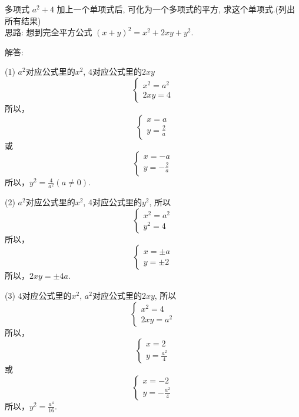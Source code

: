 \item {
    多项式 $a^2 + 4$ 加上一个单项式后, 可化为一个多项式的平方, 求这个单项式.(列出所有结果)
    \ifshowSolution
    \fangsong{}
    \\
    思路: 想到完全平方公式 $(x + y)^2 = x^2 + 2xy + y^2$.

    解答: 

    (1) $a^2$对应公式里的$x^2$, $4$对应公式里的$2xy$
    \[\left\{ 
        \begin{array}{lc}
            x^2 = a^2\\
            2xy = 4
        \end{array}
    \right.\]
    所以，
    \[\left\{ 
        \begin{array}{lc}
            x = a\\
            y = \frac2a
        \end{array}
    \right.\]
    或
    \[\left\{ 
        \begin{array}{lc}
            x = -a\\
            y = -\frac2a
        \end{array}
    \right.\]
    所以，$y^2 = \frac{4}{a^2} (a\neq 0).$

    (2) $a^2$对应公式里的$x^2$, $4$对应公式里的$y^2$, 所以
    \[\left\{ 
        \begin{array}{lc}
            x^2 = a^2 \\
            y^2 = 4
        \end{array}
    \right.\]
    所以，
    \[\left\{ 
        \begin{array}{lc}
            x = \pm a \\
            y = \pm 2
        \end{array}
    \right.\]
    所以，$2xy = \pm 4a.$

    
    (3) $4$对应公式里的$x^2$, $a^2$对应公式里的$2xy$, 所以
    \[\left\{ 
        \begin{array}{lc}
            x^2 = 4 \\
            2xy = a^2
        \end{array}
    \right.\]
    所以，
    \[\left\{ 
        \begin{array}{lc}
            x = 2 \\
            y = \frac{a^2}{4}
        \end{array}
    \right.\]
    或
    \[\left\{ 
        \begin{array}{lc}
            x = -2 \\
            y = -\frac{a^2}{4}
        \end{array}
    \right.\]
    所以，$y^2 = \frac{a^4}{16}.$
    \else
        \\ \\ \\
    \fi
}

